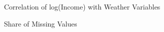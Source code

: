 \begin{figure}[H]
    \centering
    \caption{Correlation of log(Income) with Weather Variables}
    \label{fig:enter-label}
\end{figure}


\begin{figure}[H]
    \centering
    \caption{Share of Missing Values}
    \label{fig:enter-label}
\end{figure}
